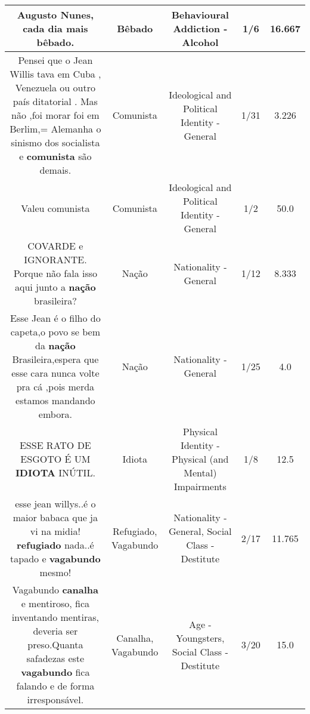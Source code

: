 \documentclass[11pt]{article}
\newlength\mylength
\begin{document}
\begin{center}
\begin{longtable}{|C{.65\mylength}|C{.30\mylength}|C{.12\mylength}|C{.12\mylength}|C{.12\mylength}|}
  \small Augusto Nunes, cada dia mais \textbf{bêbado}.\normalsize   & Bêbado & Behavioural Addiction - Alcohol & 1/6 & 16.667 \\  \hline
  \small Pensei que o Jean Willis tava  em Cuba , Venezuela ou outro país ditatorial  . Mas não ,foi morar foi em Berlim,= Alemanha  o sinismo dos  socialista e \textbf{comunista} são demais.\normalsize   & Comunista & Ideological and Political Identity - General & 1/31 & 3.226 \\  \hline
  \small Valeu comunista\normalsize   & Comunista & Ideological and Political Identity - General & 1/2 & 50.0 \\  \hline
  \small COVARDE e IGNORANTE. Porque não fala isso aqui junto a \textbf{nação} brasileira?\normalsize   & Nação & Nationality - General & 1/12 & 8.333 \\  \hline
  \small Esse Jean é o filho do capeta,o povo se bem da \textbf{nação} Brasileira,espera que esse cara nunca volte pra cá ,pois merda estamos mandando embora.\normalsize   & Nação & Nationality - General & 1/25 & 4.0 \\  \hline
  \small ESSE RATO DE ESGOTO É UM \textbf{IDIOTA} INÚTIL.\normalsize   & Idiota & Physical Identity - Physical (and Mental) Impairments & 1/8 & 12.5 \\  \hline
  \small esse jean willys..é o maior babaca que ja vi na midia! \textbf{refugiado} nada..é tapado e \textbf{vagabundo} mesmo!\normalsize   & Refugiado, Vagabundo & Nationality - General, Social Class - Destitute & 2/17 & 11.765 \\  \hline
  \small Vagabundo \textbf{canalha} e mentiroso, fica inventando mentiras, deveria ser preso.Quanta safadezas este \textbf{vagabundo} fica falando e de forma irresponsável.\normalsize   & Canalha, Vagabundo & Age - Youngsters, Social Class - Destitute & 3/20 & 15.0 \\  \hline

\end{longtable}
\end{center}
\end{document}
